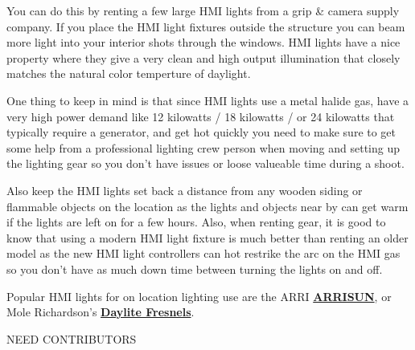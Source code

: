 \begin{fullwidth}
You can do this by renting a few large HMI lights from a grip & camera supply company. If you place the HMI light fixtures outside the structure you can beam more light into your interior shots through the windows. HMI lights have a nice property where they give a very clean and high output illumination that closely matches the natural color temperture of daylight.

One thing to keep in mind is that since HMI lights use a metal halide gas, have a very high power demand like 12 kilowatts / 18 kilowatts / or 24 kilowatts that typically require a generator, and get hot quickly you need to make sure to get some help from a professional lighting crew person when moving and setting up the lighting gear so you don't have issues or loose valueable time during a shoot.

Also keep the HMI lights set back a distance from any wooden siding or flammable objects on the location as the lights and objects near by can get warm if the lights are left on for a few hours. Also, when renting gear, it is good to know that using a modern HMI light fixture is much better than renting an older model as the new HMI light controllers can hot restrike the arc on the HMI gas so you don't have as much down time between turning the lights on and off.

Popular HMI lights for on location lighting use are the ARRI \textbf{\href{http://www.arri.com/lighting/lighting_equipment/lampheads/daylight_hmi_lampheads/}{ARRISUN}}, or Mole Richardson's \textbf{\href{http://mole.com/products/index/daylite-fesnels}{Daylite Fresnels}}.

NEED CONTRIBUTORS

\clearpage
\end{fullwidth}